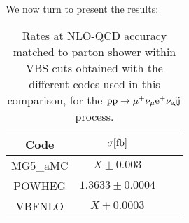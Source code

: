 We now turn to present the results:



\begin{table}[h!]
    \centering
    \begin{tabular}{c|c|c|c}
        Code  &  $\sigma[\rm{fb}]$  \\
        \hline
        \hline
        {\sc MG5\_aMC}&  $X  \pm 0.003$  \\
        {\sc POWHEG}  &  $1.3633 \pm 0.0004$  \\
        {\sc VBFNLO}  &  $X \pm 0.0003$  \\
    \end{tabular}
    \caption{\label{tab:wg1_NLOrates} Rates at NLO-QCD accuracy matched to parton shower within VBS cuts obtained with the different codes used in this comparison, 
    for the ${\rm p}{\rm p}\to\mu^+\nu_\mu{\rm e}^+\nu_{\rm e}{\rm j}{\rm j}$ process.}
\end{table}
